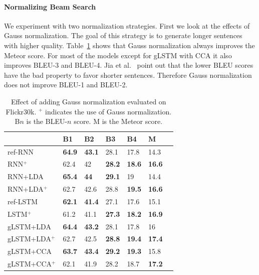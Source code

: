 \documentclass[twoside,twocolumn]{article}
\begin{document}
	
	\paragraph{Normalizing Beam Search}
	We experiment with two normalization strategies. First we look at the effects of Gauss normalization. The goal of this strategy is to generate longer sentences with higher quality. Table~\ref{table:results_gauss} shows that Gauss normalization always improves the Meteor score. For most of the models except for gLSTM with CCA it also improves BLEU-3 and BLEU-4. Jia et al.~\cite{Jia2014} point out that the lower BLEU scores have the bad property to favor shorter sentences. Therefore Gauss normalization does not improve BLEU-1 and BLEU-2.
	
	\begin{table}
		\centering
		\begin{tabular}{lllllll}
			& B1 & B2 & B3 & B4 & M \\ \hline
			ref-RNN          & \textbf{64.9}  & \textbf{43.1}     & 28.1   & 17.8   & 14.3          \\
			RNN$^+$       & 62.4   & 42     & \textbf{28.2}   & \textbf{18.6}   & \textbf{16.6}          \\ \hline
			RNN+LDA         & \textbf{65.4}   & \textbf{44}     & \textbf{29.1}   &19     & 14.4 \\
			RNN+LDA$^+$ & 62.7   & 42.6   & 28.8   & \textbf{19.5}   & \textbf{16.6}           \\ \hline 
			ref-LSTM         & \textbf{62.1}   & \textbf{41.4}   & 27.1   & 17.6   & 15.1  \\
			LSTM$^+$        & 61.2   & 41.1   & \textbf{27.3}   & \textbf{18.2}   & \textbf{16.9}  \\ \hline
			gLSTM+LDA         & \textbf{64.4}   & \textbf{43.2}   & 28.1   & 17.8   & 16  \\
			gLSTM+LDA$^+$ & 62.7   & 42.5   & \textbf{28.8}   & \textbf{19.4}   & \textbf{17.4}  \\\hline
			gLSTM+CCA         & \textbf{63.7}   & \textbf{43.4}   & \textbf{29.2}   &\textbf{19.3}   & 15.8  \\
			gLSTM+CCA$^+$ & 62.1   & 41.9   & 28.2   & 18.7   & \textbf{17.2}  \\\hline
		\end{tabular}
		\caption{Effect of adding Gauss normalization evaluated on Flickr30k. $^+$ indicates the use of Gauss normalization. B$n$ is the BLEU-$n$ score. M is the Meteor score.}
		\label{table:results_gauss}
	\end{table}
	
\end{document}
